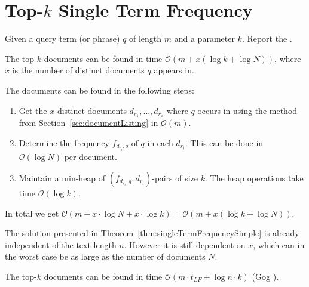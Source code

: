 \section{Top-$k$ Single Term Frequency}

\begin{Definition}
  Given a query term (or phrase) $q$ of length $m$ and a parameter $k$. Report the .
\end{Definition}

\begin{Theorem}
  \label{thm:singleTermFrequencySimple}
  The top-$k$ documents can be found in time $\mathcal{O}(m + x(\log k + \log N))$, where $x$ is the number of distinct documents $q$ appears in.
\end{Theorem}

\begin{Proof}
  The documents can be found in the following steps:
  \begin{enumerate}
    \item Get the $x$ distinct documents $d_{r_1}, \ldots, d_{r_x}$ where $q$ occurs in using the method from Section~\ref{sec:documentListing} in $\mathcal{O}(m)$.
    \item Determine the frequency $f_{d_{r_i},q}$ of $q$ in each $d_{r_i}$. This can be done in $\mathcal{O}(\log N)$ per document.
    \item Maintain a min-heap of $(f_{d_{r_i},q}, d_{r_i})$-pairs of size $k$. The heap operations take time $\mathcal{O}(\log k)$.
  \end{enumerate}
  In total we get $\mathcal{O}(m + x \cdot \log N + x \cdot \log k) = \mathcal{O}(m + x(\log k + \log N))$.
\end{Proof}

The solution presented in Theorem~\ref{thm:singleTermFrequencySimple} is already independent of the text length $n$. However it is still dependent on $x$, which can in the worst case be as large as the number of documents $N$.

\begin{Theorem}
  The top-$k$ documents can be found in time $\mathcal{O}(m \cdot t_{LF} + \log n\cdot k)$ (Gog \cite{Gog2015}).
\end{Theorem}

